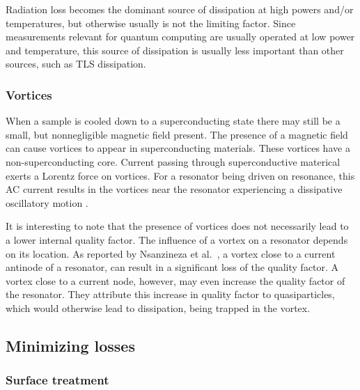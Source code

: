       Radiation loss becomes the dominant source of dissipation at high powers and/or temperatures, but otherwise usually is not the limiting factor. Since measurements relevant for quantum computing are usually operated at low power and temperature, this source of dissipation is usually less important than other sources, such as TLS dissipation.



    \subsubsection{Vortices}

      When a sample is cooled down to a superconducting state there may still be a small, but nonnegligible magnetic field present. The presence of a magnetic field can cause vortices to appear in superconducting materials. These vortices have a non-superconducting core. Current passing through superconductive materical exerts a Lorentz force on vortices. For a resonator being driven on resonance, this AC current results in the vortices near the resonator experiencing a dissipative oscillatory motion \cite{plourde2009microwave}.

      It is interesting to note that the presence of vortices does not necessarily lead to a lower internal quality factor. The influence of a vortex on a resonator depends on its location. As reported by Nsanzineza et al.~\cite{nsanzineza2014trapping}, a vortex close to a current antinode of a resonator, can result in a significant loss of the quality factor. A vortex close to a current node, however, may even increase the quality factor of the resonator. They attribute this increase in quality factor to quasiparticles, which would otherwise lead to dissipation, being trapped in the vortex.





  \subsection{Minimizing losses}

  \subsubsection{Surface treatment}

